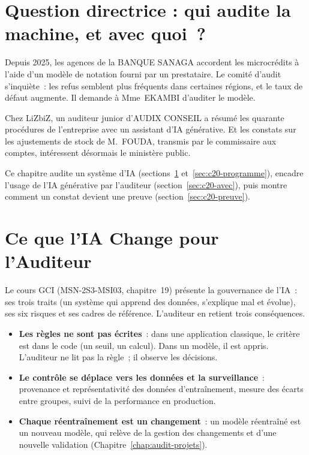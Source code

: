 \bigskip

\section*{Question directrice : qui audite la machine, et avec quoi~?}

Depuis 2025, les agences de la BANQUE SANAGA accordent les microcrédits à
l'aide d'un modèle de notation fourni par un prestataire. Le comité
d'audit s'inquiète~: les refus semblent plus fréquents dans certaines
régions, et le taux de défaut augmente. Il demande à Mme~EKAMBI d'auditer
le modèle.

Chez LiZbiZ, un auditeur junior d'AUDIX CONSEIL a résumé les quarante
procédures de l'entreprise avec un assistant d'IA générative. Et les
constats sur les ajustements de stock de M.~FOUDA, transmis par le
commissaire aux comptes, intéressent désormais le ministère public.

Ce chapitre audite un système d'IA (sections~\ref{sec:c20-risques}
et~\ref{sec:c20-programme}), encadre l'usage de l'IA générative par
l'auditeur (section~\ref{sec:c20-avec}), puis montre comment un constat
devient une preuve (section~\ref{sec:c20-preuve}).

\separateur

\section{Ce que l'IA Change pour l'Auditeur}
\label{sec:c20-risques}

Le cours GCI (MSN-2S3-MSI03, chapitre~19) présente la gouvernance de
l'IA~: ses trois traits (un système qui apprend des données, s'explique
mal et évolue), ses six risques et ses cadres de référence. L'auditeur en
retient trois conséquences.

\begin{itemize}
    \item \textbf{Les règles ne sont pas écrites}~: dans une application
          classique, le critère est dans le code (un seuil, un calcul). Dans
          un modèle, il est appris. L'auditeur ne lit pas la règle~; il
          observe les décisions.
    \item \textbf{Le contrôle se déplace vers les données et la
          surveillance}~: provenance et représentativité des données
          d'entraînement, mesure des écarts entre groupes, suivi de la
          performance en production.
    \item \textbf{Chaque réentraînement est un changement}~: un modèle
          réentraîné est un nouveau modèle, qui relève de la gestion des
          changements et d'une nouvelle validation
          (Chapitre~\ref{chap:audit-projets}).
\end{itemize}

